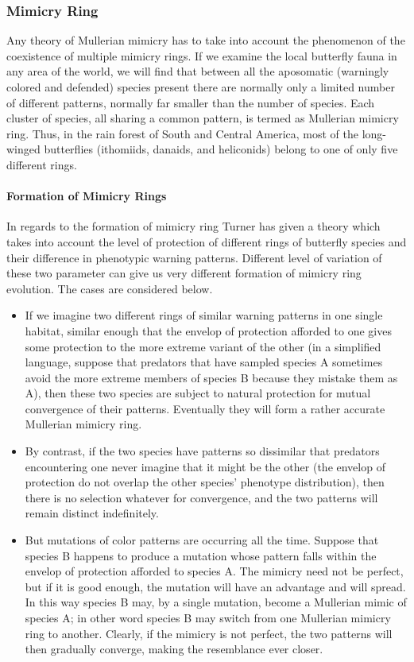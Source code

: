 \documentclass[letterpaper]{article}
\numberwithin{equation}{section}
\begin{document}
\subsubsection{Mimicry Ring}
Any theory of Mullerian mimicry has to take into account the phenomenon of the coexistence of multiple mimicry rings. If we examine the local butterfly fauna in any area of the world, we will find that between all the aposomatic (warningly colored and defended) species present there are normally only a limited number of different patterns, normally far smaller than the number of species. Each cluster of species, all sharing a common pattern, is termed as Mullerian mimicry ring. Thus, in the rain forest of South and Central America, most of the long-winged butterflies (ithomiids, danaids, and heliconids) belong to one of only five different rings.

\paragraph{Formation of Mimicry Rings}
In regards to the formation of mimicry ring Turner \cite{turner1988} has given a theory which takes into account the level of protection of different rings of butterfly species and their difference in phenotypic warning patterns. Different level of variation of these two parameter can give us very different formation of mimicry ring evolution. The cases are considered below.

\begin{itemize}
	\item If we imagine two different rings of similar warning patterns in one single habitat, similar enough that the envelop of protection afforded to one gives some protection to the more extreme variant of the other (in a simplified language, suppose that predators that have sampled species A sometimes avoid the more extreme members of species B because they mistake them as A), then these two species are subject to natural protection for mutual convergence of their patterns. Eventually they will form a rather accurate Mullerian mimicry ring.
	\item By contrast, if the two species have patterns so dissimilar that predators encountering one never imagine that it might be the other (the envelop of protection do not overlap the other species' phenotype distribution), then there is no selection whatever for convergence, and the two patterns will remain distinct indefinitely.
 \item But mutations of color patterns are occurring all the time. Suppose that species B happens to produce a mutation whose pattern falls within the envelop of protection afforded to species A. The mimicry need not be perfect, but if it is good enough, the mutation will have an advantage and will spread. In this way species B may, by a single mutation, become a Mullerian mimic of species A; in other word species B may switch from one Mullerian mimicry ring to another. Clearly, if the mimicry is not perfect, the two patterns will then gradually converge, making the resemblance ever closer. 
\end{itemize}
\end{document}
